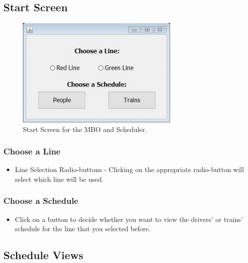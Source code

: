 \documentclass[letterpaper]{article}
\begin{document}
\subsection{Start Screen}

\begin{figure}[h!]
	\center
	\includegraphics[width=8cm]{main_screen}
	\caption{Start Screen for the MBO and Scheduler.}
\end{figure}


\subsubsection{Choose a Line}
\begin{itemize}
	\item Line Selection Radio-buttons - Clicking on the appropriate radio-button will select which line will be used.
\end{itemize}
\subsubsection{Choose a Schedule}
\begin{itemize}
	\item Click on a button to decide whether you want to view the drivers' or trains' schedule for the line that you selected before.
\end{itemize}

\subsection{Schedule Views}
\end{document}
